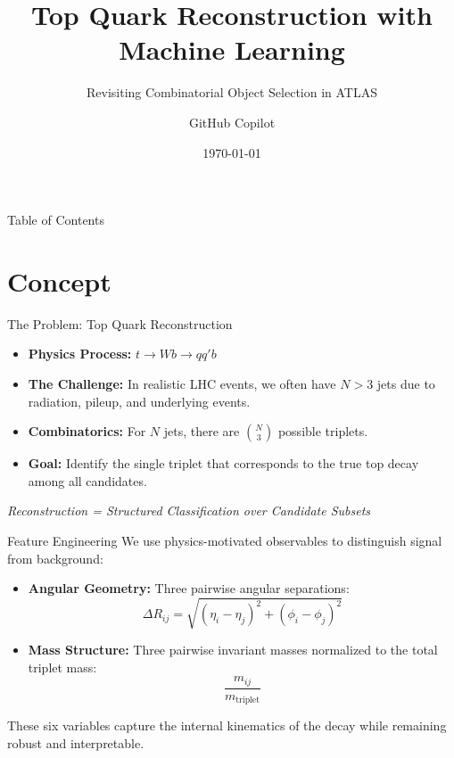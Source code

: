 \documentclass{beamer}
\title{Top Quark Reconstruction with Machine Learning}
\subtitle{Revisiting Combinatorial Object Selection in ATLAS}
\author{GitHub Copilot}
\date{\today}
\begin{document}
\begin{frame}
  \titlepage
\end{frame}

\begin{frame}{Table of Contents}
  \tableofcontents
\end{frame}

\section{Concept}
\begin{frame}{The Problem: Top Quark Reconstruction}
  \begin{itemize}
    \item \textbf{Physics Process:} $t \to Wb \to q q' b$
    \item \textbf{The Challenge:} In realistic LHC events, we often have $N > 3$ jets due to radiation, pileup, and underlying events.
    \item \textbf{Combinatorics:} For $N$ jets, there are $\binom{N}{3}$ possible triplets.
    \item \textbf{Goal:} Identify the single triplet that corresponds to the true top decay among all candidates.
  \end{itemize}
  \vfill
  \centering
  \textit{Reconstruction = Structured Classification over Candidate Subsets}
\end{frame}

\begin{frame}{Feature Engineering}
  We use physics-motivated observables to distinguish signal from background:
  \begin{itemize}
    \item \textbf{Angular Geometry:} Three pairwise angular separations:
      \[ \Delta R_{ij} = \sqrt{(\eta_i - \eta_j)^2 + (\phi_i - \phi_j)^2} \]
    \item \textbf{Mass Structure:} Three pairwise invariant masses normalized to the total triplet mass:
      \[ \frac{m_{ij}}{m_{\text{triplet}}} \]
  \end{itemize}
  \vfill
  These six variables capture the internal kinematics of the decay while remaining robust and interpretable.
\end{frame}
\end{document}
